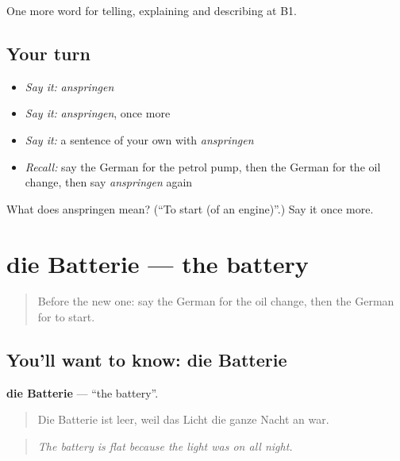 \begin{grammarlens}[title={What you've built}]
One more word for telling, explaining and describing at B1.
\end{grammarlens}

\subsection*{Your turn}
\begin{itemize}
\raggedright
  \item \emph{Say it:} \emph{anspringen}
  \item \emph{Say it:} \emph{anspringen}, once more
  \item \emph{Say it:} a sentence of your own with \emph{anspringen}
  \item \emph{Recall:} say the German for the petrol pump, then the German for the oil change, then say \emph{anspringen} again
\end{itemize}

\begin{tcolorbox}[breakable,colback=teal!4,colframe=teal!35!black,title={Before you move on}]
What does anspringen mean? (\textquotedblleft{}To start (of an engine)\textquotedblright{}.) Say it once more.
\end{tcolorbox}
\section[die Batterie]{die Batterie — the battery}

\label{lesson:GE-C403-batterie}



\begin{quote}
Before the new one: say the German for the oil change, then the German for to start.
\end{quote}

\subsection*{You'll want to know: die Batterie}
\textbf{die Batterie} — \textquotedblleft{}the battery\textquotedblright{}.

\begin{quote}
Die Batterie ist leer, weil das Licht die ganze Nacht an war.
\end{quote}

\begin{quote}
\emph{The battery is flat because the light was on all night.}
\end{quote}

